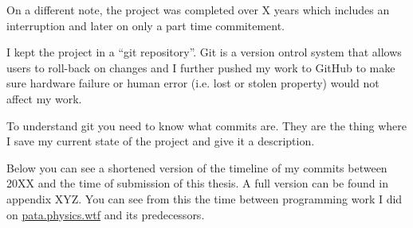 On a different note, the project was completed over X years which includes an interruption and later on only a part time commitement.

I kept the project in a ``git repository''. Git is a version ontrol system that allows users to roll-back on changes and I further pushed my work to GitHub to make sure hardware failure or human error (i.e. lost or stolen property) would not affect my work. 

To understand git you need to know what commits are. They are the thing where I save my current state of the project and give it a description.

Below you can see a shortened version of the timeline of my commits between 20XX and the time of submission of this thesis. A full version can be found in appendix XYZ. You can see from this the time between programming work I did on \url{pata.physics.wtf} and its predecessors.


